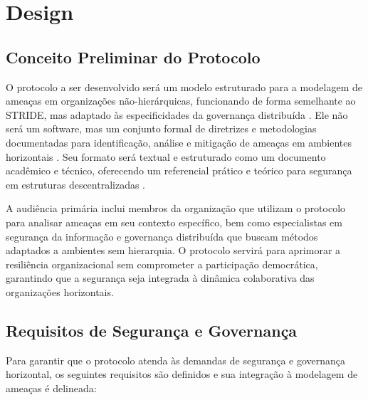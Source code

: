 
%

\chapter{Design}
\label{cha:design}

\glsresetall
 
\section{Conceito Preliminar do Protocolo}
\label{sec:preliminary_protocol_concept}

O protocolo a ser desenvolvido será um modelo estruturado para a modelagem de
ameaças em organizações não-hierárquicas, funcionando de forma semelhante ao
STRIDE, mas adaptado às especificidades da governança distribuída
\cite{ThreatModelingdesigningForSecurity}.
Ele não será um software, mas um conjunto formal de diretrizes e metodologias documentadas
para identificação, análise e mitigação de ameaças em ambientes horizontais \cite{Colbac}.
Seu formato será textual e estruturado como um documento acadêmico e técnico,
oferecendo um referencial prático e teórico para segurança em estruturas
descentralizadas .

A audiência primária inclui membros da organização que utilizam o protocolo para
analisar ameaças em seu contexto específico, bem como especialistas em segurança
da informação e governança distribuída que buscam métodos adaptados a ambientes
sem hierarquia. O protocolo servirá para aprimorar a resiliência organizacional
sem comprometer a participação democrática, garantindo que a segurança seja
integrada à dinâmica colaborativa das organizações horizontais.

\section{Requisitos de Segurança e Governança}
\label{sec:security_governance_requirements}

Para garantir que o protocolo atenda às demandas de segurança e governança
horizontal, os seguintes requisitos são definidos e sua integração à modelagem
de ameaças é delineada:
    
